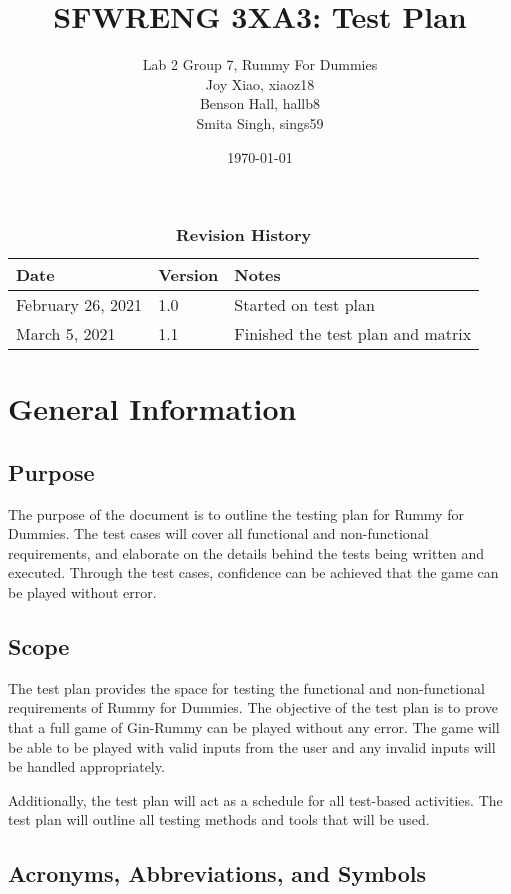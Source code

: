 \documentclass[12pt, titlepage]{article}
\title{SFWRENG 3XA3: Test Plan}
\author{Lab 2 Group 7, Rummy For Dummies
		\\ Joy Xiao, xiaoz18
		\\ Benson Hall, hallb8
		\\ Smita Singh, sings59
}
\date{\today}
\begin{document}
\maketitle

\tableofcontents
\listoftables
\listoffigures

\begin{table}[bp]
\caption{\bf Revision History}
\begin{tabularx}{\textwidth}{p{3cm}p{2cm}X}
\toprule {\bf Date} & {\bf Version} & {\bf Notes}\\
\midrule
February 26, 2021 & 1.0 & Started on test plan \\
March 5, 2021 & 1.1 & Finished the test plan and matrix \\
\bottomrule
\end{tabularx}
\end{table}

\newpage


\section{General Information}
\subsection{Purpose}
The purpose of the document is to outline the testing plan for Rummy for Dummies. The test cases will cover all functional and non-functional requirements, and elaborate on the details behind the tests being written and executed. Through the test cases, confidence can be achieved that the game can be played without error.

\subsection{Scope}
The test plan provides the space for testing the functional and non-functional requirements of Rummy for Dummies. The objective of the test plan is to prove that a full game of Gin-Rummy can be played without any error. The game will be able to be played with valid inputs from the user and any invalid inputs will be handled appropriately.

Additionally, the test plan will act as a schedule for all test-based activities. The test plan will outline all testing methods and tools that will be used.

\subsection{Acronyms, Abbreviations, and Symbols}
	
\end{document}
